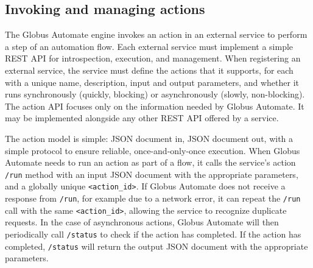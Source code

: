 \documentclass{aip-cp}
\newcommand\code[1]{{\tt \footnotesize #1}}
\newcommand\bluecode[1]{\code{#1}}
\newcommand\darkcode[1]{\code{#1}}
\begin{document}
\subsection{Invoking and managing actions}
The Globus Automate engine invokes an action in an external service to 
perform a step of an automation flow. Each external service must implement a
simple REST API for introspection, execution, and management. 
When registering an external service, the service must 
define the actions that it supports, for each with
a unique name, description, input and output parameters, 
and whether it runs synchronously (quickly, blocking)
or asynchronously (slowly, non-blocking).
The action API focuses only on the information 
needed by Globus Automate.
It may be implemented alongside any other REST API offered by a service.

%

The action model is simple: JSON document in, JSON document out, with a simple protocol to ensure 
reliable, once-and-only-once execution.
When Globus Automate needs to run an action as part of a flow, it calls the service's action 
\darkcode{/run} method with an input JSON document with the appropriate parameters, and a globally 
unique \code{<action\_id>}.  
If Globus Automate does not receive a response from \darkcode{/run}, for example due to a network 
error, 
it can repeat the \darkcode{/run} call with the same \code{<action\_id>}, allowing the service to 
recognize duplicate requests.  
In the case of asynchronous actions, Globus Automate will then periodically call \darkcode{/status} 
to check if the action  has completed. 
If the action has completed, \darkcode{/status} will return the output JSON document with the 
appropriate parameters.  
 
\end{document}
